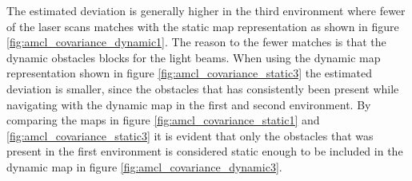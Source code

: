 The estimated deviation is generally higher in the third environment where fewer of the laser scans matches with the static map representation as shown in figure \ref{fig:amcl_covariance_dynamic1}. 
The reason to the fewer matches is that the dynamic obstacles blocks for the light beams. 
When using the dynamic map representation shown in figure \ref{fig:amcl_covariance_static3} the estimated deviation is smaller, since the obstacles that has consistently been present while navigating with the dynamic map in the first and second environment.
By comparing the maps in figure  \ref{fig:amcl_covariance_static1} and \ref{fig:amcl_covariance_static3} it is evident that only the obstacles that was present in the first environment is considered static enough to be included in the dynamic map in figure \ref{fig:amcl_covariance_dynamic3}.


